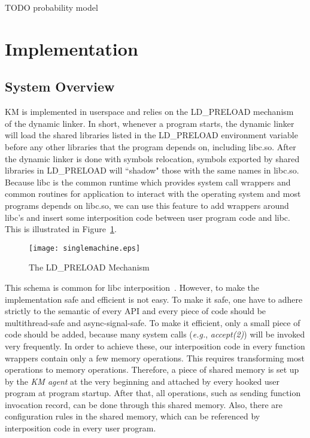 \documentclass[letterpaper,twocolumn,10pt]{article}
\begin{document}
TODO probability model

\section{Implementation}

\subsection{System Overview}
KM is implemented in userspace and relies on the LD\_PRELOAD
mechanism~\cite{LD-PRELOAD-CITE} of the dynamic linker. In short, whenever a
program starts, the dynamic linker will load the shared libraries listed in
the LD\_PRELOAD environment variable before any other libraries that the
program depends on, including libc.so. After the dynamic linker is done with
symbols relocation, symbols exported by shared libraries in LD\_PRELOAD will
``shadow" those with the same names in libc.so. Because libc is the common
runtime which provides system call wrappers and common routines for application to interact with
the operating system and most programs depends on libc.so, we can use this
feature to add wrappers around libc's and insert some interposition code between
user program code and libc. This is illustrated in Figure~\ref{fig:ldpreload}.

\begin{figure}[H]
    \centering
    \texttt{[image: singlemachine.eps]}
    \caption{The LD\_PRELOAD Mechanism}
    \label{fig:ldpreload}
\end{figure}

This schema is common for libc interposition~\cite{citesomebody}. However, to
make the implementation safe and efficient is not easy. To make it safe, one
have to adhere strictly to the semantic of every API and every piece of code
should be multithread-safe and async-signal-safe. To make it efficient, only
a small piece of code should be added, because many system calls
(\textit{e.g.}, \textit{accept(2)}) will be invoked very frequently. In order
to achieve these, our interposition code in every function wrappers contain
only a few memory operations. This requires transforming most operations to
memory operations. Therefore, a piece of shared memory is set up by the
\textit{KM agent} at the very beginning and attached by every hooked user
program at program startup. After that, all operations, such as sending
function invocation record, can be done through this shared memory. Also,
there are configuration rules in the shared memory, which can be referenced
by interposition code in every user program.\\ 
\end{document}
